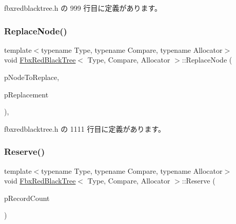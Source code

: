  fbxredblacktree.\+h の 999 行目に定義があります。

\mbox{\label{class_fbx_red_black_tree_a80886c4cbd8f7a9f492f9b52effbdfa9}} 
\subsubsection{\texorpdfstring{Replace\+Node()}{ReplaceNode()}}
{\footnotesize\ttfamily template$<$typename Type, typename Compare, typename Allocator$>$ \\
void \hyperlink{class_fbx_red_black_tree}{Fbx\+Red\+Black\+Tree}$<$ Type, Compare, Allocator $>$\+::Replace\+Node (\begin{DoxyParamCaption}\item[{\hyperlink{class_fbx_red_black_tree_1_1_record_type}{Record\+Type} $\ast$}]{p\+Node\+To\+Replace,  }\item[{\hyperlink{class_fbx_red_black_tree_1_1_record_type}{Record\+Type} $\ast$}]{p\+Replacement }\end{DoxyParamCaption})\hspace{0.3cm}{\ttfamily [inline]}, {\ttfamily [protected]}}



 fbxredblacktree.\+h の 1111 行目に定義があります。

\mbox{\label{class_fbx_red_black_tree_a707730fca6c73fea996c8354a0a6ead2}} 
\subsubsection{\texorpdfstring{Reserve()}{Reserve()}}
{\footnotesize\ttfamily template$<$typename Type, typename Compare, typename Allocator$>$ \\
void \hyperlink{class_fbx_red_black_tree}{Fbx\+Red\+Black\+Tree}$<$ Type, Compare, Allocator $>$\+::Reserve (\begin{DoxyParamCaption}\item[{unsigned int}]{p\+Record\+Count }\end{DoxyParamCaption})\hspace{0.3cm}{\ttfamily [inline]}}


